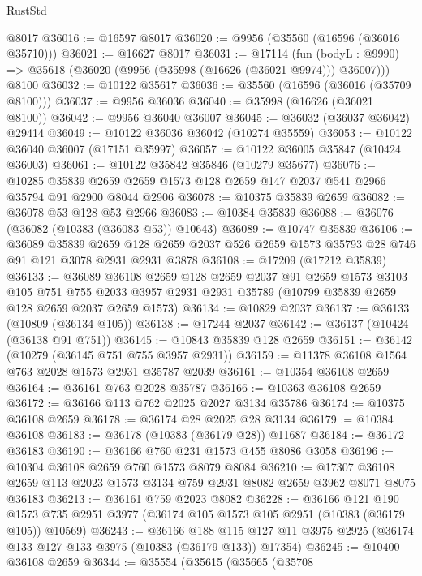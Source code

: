\begin{lexlean}{RustStd}
\begin{coremodule}
    @8017
@36016 := @16597 @8017
@36020 := @9956 (@35560 (@16596 (@36016 @35710)))
@36021 := @16627 @8017
@36031 := @17114
    (fun (bodyL : @9990) => @35618 (@36020 (@9956 (@35998 (@16626 (@36021 @9974))) @36007)))
    @8100
@36032 := @10122 @35617
@36036 := @35560 (@16596 (@36016 (@35709 @8100)))
@36037 := @9956 @36036
@36040 := @35998 (@16626 (@36021 @8100))
@36042 := @9956 @36040 @36007
@36045 := @36032 (@36037 @36042) @29414
@36049 := @10122 @36036 @36042 (@10274 @35559)
@36053 := @10122 @36040 @36007 (@17151 @35997)
@36057 := @10122 @36005 @35847 (@10424 @36003)
@36061 := @10122 @35842 @35846 (@10279 @35677)
@36076 := @10285
    @35839
    @2659
    @2659
    @1573
    @128
    @2659
    @147
    @2037
    @541
    @2966
    @35794
    @91
    @2900
    @8044
    @2906
@36078 := @10375 @35839 @2659
@36082 := @36078 @53 @128 @53 @2966
@36083 := @10384 @35839
@36088 := @36076 (@36082 (@10383 (@36083 @53)) @10643)
@36089 := @10747 @35839
@36106 := @36089
    @35839
    @2659
    @128
    @2659
    @2037
    @526
    @2659
    @1573
    @35793
    @28
    @746
    @91
    @121
    @3078
    @2931
    @2931
    @3878
@36108 := @17209 (@17212 @35839)
@36133 := @36089
    @36108
    @2659
    @128
    @2659
    @2037
    @91
    @2659
    @1573
    @3103
    @105
    @751
    @755
    @2033
    @3957
    @2931
    @2931
    @35789
    (@10799 @35839 @2659 @128 @2659 @2037 @2659 @1573)
@36134 := @10829 @2037
@36137 := @36133 (@10809 (@36134 @105))
@36138 := @17244 @2037
@36142 := @36137 (@10424 (@36138 @91 @751))
@36145 := @10843 @35839 @128 @2659
@36151 := @36142 (@10279 (@36145 @751 @755 @3957 @2931))
@36159 := @11378 @36108 @1564 @763 @2028 @1573 @2931 @35787 @2039
@36161 := @10354 @36108 @2659
@36164 := @36161 @763 @2028 @35787
@36166 := @10363 @36108 @2659
@36172 := @36166 @113 @762 @2025 @2027 @3134 @35786
@36174 := @10375 @36108 @2659
@36178 := @36174 @28 @2025 @28 @3134
@36179 := @10384 @36108
@36183 := @36178 (@10383 (@36179 @28)) @11687
@36184 := @36172 @36183
@36190 := @36166 @760 @231 @1573 @455 @8086 @3058
@36196 := @10304 @36108 @2659 @760 @1573 @8079 @8084
@36210 := @17307 @36108 @2659 @113 @2023 @1573 @3134 @759 @2931 @8082 @2659 @3962 @8071 @8075 @36183
@36213 := @36161 @759 @2023 @8082
@36228 := @36166
    @121
    @190
    @1573
    @735
    @2951
    @3977
    (@36174 @105 @1573 @105 @2951 (@10383 (@36179 @105)) @10569)
@36243 := @36166
    @188
    @115
    @127
    @11
    @3975
    @2925
    (@36174 @133 @127 @133 @3975 (@10383 (@36179 @133)) @17354)
@36245 := @10400 @36108 @2659
@36344 := @35554
    (@35615
      (@35665
        (@35708

\end{coremodule}
\end{lexlean}
